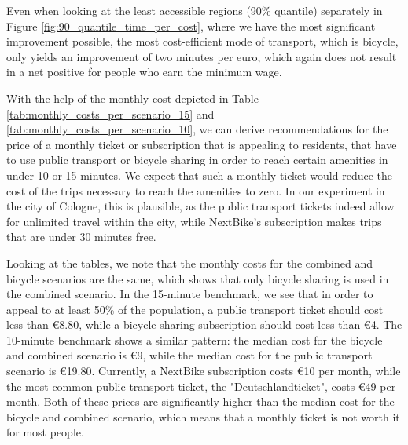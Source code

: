 Even when looking at the least accessible regions (90\% quantile) separately in Figure \ref{fig:90_quantile_time_per_cost}, where we have the most significant improvement possible, the most cost-efficient mode of transport, which is bicycle, only yields an improvement of two minutes per euro, which again does not result in a net positive for people who earn the minimum wage.


With the help of the monthly cost depicted in Table \ref{tab:monthly_costs_per_scenario_15} and \ref{tab:monthly_costs_per_scenario_10}, we can derive recommendations for the price of a monthly ticket or subscription that is appealing to residents, that have to use public transport or bicycle sharing in order to reach certain amenities in under 10 or 15 minutes.
We expect that such a monthly ticket would reduce the cost of the trips necessary to reach the amenities to zero.
In our experiment in the city of Cologne, this is plausible, as the public transport tickets indeed allow for unlimited travel within the city, while NextBike's subscription makes trips that are under 30 minutes free.

Looking at the tables, we note that the monthly costs for the combined and bicycle scenarios are the same, which shows that only bicycle sharing is used in the combined scenario.
In the 15-minute benchmark, we see that in order to appeal to at least 50\% of the population, a public transport ticket should cost less than \euro{8.80}, while a bicycle sharing subscription should cost less than \euro{4}.
The 10-minute benchmark shows a similar pattern: the median cost for the bicycle and combined scenario is \euro{9}, while the median cost for the public transport scenario is \euro{19.80}.
Currently, a NextBike subscription costs \euro{10} per month, while the most common public transport ticket, the "Deutschlandticket", costs \euro{49} per month.
Both of these prices are significantly higher than the median cost for the bicycle and combined scenario, which means that a monthly ticket is not worth it for most people.

